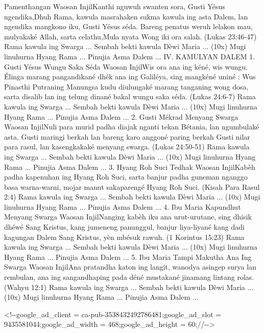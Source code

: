 \documentclass{scrbook}
\begin{document}
Pamenthangan Waosan InjilKanthi nguwuh swanten sora, Gusti Y\'esus
ngendika,{\textquotedbl}Dhuh Rama, kawula masrahaken sukma kawula ing
asta Dalem, lan ngendika mangkono iku, Gusti Y\'esus s\'eda. Bareng
penatus weruh lelakon mau, mulyakak\'e Allah, sarta
celathu,{\textquotedbl}Mula nyata Wong iki ora salah.{\textquotedbl}
(Lukas 23:46-47) {\dag} Rama kawula ing Swarga ... {\dag} Sembah bekti
kawula D\`ewi Maria ... (10x) {\dag} Mugi linuhurna Hyang Rama ...
{\dag} Pinujia Asma Dalem ...  IV. KAMULYAN DALEM 1. Gusti Y\'esus
Wungu Saka S\'eda Waosan InjilWis ora ana ing k\'en\'e, wis wungu.
\'Elinga marang pangandikan\'e dh\'ek ana ing Galil\'eya, sing
mangk\'en\'e unin\'e : {\textquotedbl}Wus Pinasthi Putraning Manungsa
kudu diulungak\'e marang tanganing wong dosa, sarta disalib lan ing
telung dinan\'e bakal wungu saka s\'eda.{\textquotedbl} (Lukas 24:6-7)
{\dag} Rama kawula ing Swarga ... {\dag} Sembah bekti kawula D\`ewi
Maria ... (10x) {\dag} Mugi linuhurna Hyang Rama ... {\dag} Pinujia
Asma Dalem ...  2. Gusti M\'ekrad Menyang Swarga Waosan
Injil{\textquotedbl}Nuli para murid padha diajak nganti tekan
B\'etania, lan ngumbulak\'e asta. Gusti maringi berkah lan bareng karo
anggon\'e paring berkah Gusti nilar para rasul, lan kasengkakak\'e
menyang swarga.{\textquotedbl} (Lukas 24:50-51) {\dag} Rama kawula ing
Swarga ... {\dag} Sembah bekti kawula D\`ewi Maria ... (10x) {\dag}
Mugi linuhurna Hyang Rama ... {\dag} Pinujia Asma Dalem ...  3. Hyang
Roh Suci Tedhak Waosan Injil{\textquotedbl}Kab\`eh padha kapenuhan ing
Hyang Roh Suci, sarta banjur padha guneman nganggo basa warna-warni,
mojar manut sakapareng\'e Hyang Roh Suci.{\textquotedbl} (Kisah Para
Rasul 2:4) {\dag} Rama kawula ing Swarga ... {\dag} Sembah bekti kawula
D\`ewi Maria ... (10x) {\dag} Mugi linuhurna Hyang Rama ... {\dag}
Pinujia Asma Dalem ...  4. Ibu Maria Kapundhut Menyang Swarga Waosan
Injil{\textquotedbl}Nanging kab\`eh iku ana urut-urutane, sing dhisik
dh\'ew\'e Sang Kristus, kang jumeneng panunggul, banjur liya-liyan\'e
kang dadi kagungan Dalem Sang Kristus, y\`en mb\'esuk
rawuh.{\textquotedbl} (1 Korintus 15:23) {\dag} Rama kawula ing Swarga
... {\dag} Sembah bekti kawula D\`ewi Maria ... (10x) {\dag} Mugi
linuhurna Hyang Rama ... {\dag} Pinujia Asma Dalem ...  5. Ibu Maria
Tampi Makutha Ana Ing Swarga Waosan Injil{\textquotedbl}Ana pratandha
katon ing langit, wanodya asingep surya lan rembulan, ana ing
sangandhaping pada d\'en\'e mustakan\'e jinamang lintang
rolas.{\textquotedbl} (Wahyu 12:1) {\dag} Rama kawula ing Swarga ...
{\dag} Sembah bekti kawula D\`ewi Maria ... (10x) {\dag} Mugi linuhurna
Hyang Rama ... {\dag} Pinujia Asma Dalem ...

{\textless}!-{}-google\_ad\_client =
{\textquotedbl}ca-pub-3538432492786481{\textquotedbl};google\_ad\_slot
= {\textquotedbl}9435581044{\textquotedbl};google\_ad\_width =
468;google\_ad\_height = 60;//-{}-{\textgreater}
\end{document}

